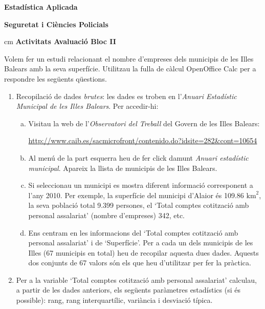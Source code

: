 \documentclass[a4paper,12pt]{report}
\begin{document}
\begin{center}
\textbf{\large Estadística Aplicada}

\textbf{\large Seguretat i Ciències Policials}

 cm
\textbf{\large Activitats Avaluació Bloc II}
\end{center}

\vskip 1cm
Volem fer un estudi relacionant el nombre d'empreses dels municipis de les
Illes Balears amb la seva superfície. Utilitzau la fulla de càlcul OpenOffice Calc per a respondre
les següents qüestions.


\begin{enumerate}
\item Recopilació de dades \textit{brutes}: les dades es troben
en l'\textit{Anuari Estadístic Municipal de les Illes Balears}. Per accedir-hi:

\begin{enumerate}[a)]
\item Visitau la web de l'\textit{Observatori del Treball} del Govern
de les Illes Balears:

\url{http://www.caib.es/sacmicrofront/contenido.do?idsite=282&cont=10654}

\item Al menú de la part esquerra heu de fer click damunt \textit{Anuari estadístic municipal}.
Apareix la llista de municipis de les Illes Balears.

\item Si seleccionau un municipi es mostra diferent informació corresponent a l'any 2010.
Per exemple, la superfície del municipi d'Alaior és 109.86 $\mathrm{km}^2$, la seva població 
total 9.399 persones, el `Total comptes cotització amb personal assalariat' (nombre d'empreses) 342, etc.

\item Ens centram en les informacions del `Total comptes cotització amb personal assalariat' i de `Superfície'. 
Per a cada un dels municipis de les Illes (67 municipis en total) heu de recopilar aquesta dues dades. 
Aquests dos conjunts de 67 valors són els que heu d'utilitzar per fer la pràctica.
\end{enumerate}

\item Per a la variable `Total comptes cotització amb personal assalariat' calculau, a partir de les dades anteriors, els 
següents paràmetres estadístics (si és possible): rang, rang interquartílic, variància i
desviació típica.


\end{enumerate}
\end{document}
